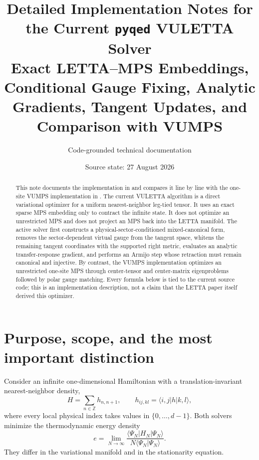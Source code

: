\documentclass[11pt]{article}
\title{Detailed Implementation Notes for the Current \texttt{pyqed} VULETTA Solver\\
\large Exact LETTA--MPS Embeddings, Conditional Gauge Fixing, Analytic Gradients,
Tangent Updates, and Comparison with VUMPS}
\author{Code-grounded technical documentation}
\date{Source state: 27 August 2026}
\begin{document}
\maketitle

\begin{abstract}
This note documents the implementation in  and compares it
line by line with the one-site VUMPS implementation in .
The current VULETTA algorithm is a direct variational optimizer for a uniform
nearest-neighbor leg-tied tensor.  It uses an exact sparse MPS embedding only
to contract the infinite state.  It does not optimize an unrestricted MPS and
does not project an MPS back into the LETTA manifold.  The active solver first
constructs a physical-sector-conditioned mixed-canonical form, removes the
sector-dependent virtual gauge from the tangent space, whitens the remaining
tangent coordinates with the supported right metric, evaluates an analytic
transfer-response gradient, and performs an Armijo step whose retraction must
remain canonical and injective.  By contrast, the VUMPS implementation
optimizes an unrestricted one-site MPS through center-tensor and center-matrix
eigenproblems followed by polar gauge matching.  Every formula below is tied
to the current source code; this is an implementation description, not a
claim that the LETTA paper itself derived this optimizer.
\end{abstract}

\tableofcontents
\clearpage

\section{Purpose, scope, and the most important distinction}

Consider an infinite one-dimensional Hamiltonian with a translation-invariant
nearest-neighbor density,
\begin{equation}
  H=\sum_{n\in\mathbb{Z}} h_{n,n+1},
  \qquad
  h_{ij,kl}=\langle i,j|h|k,l\rangle,
  \label{eq:hamiltonian}
\end{equation}
where every local physical index takes values in
$\{0,\ldots,d-1\}$.  Both solvers minimize the thermodynamic energy density
\begin{equation}
  e=\lim_{N\rightarrow\infty}
  \frac{\langle\Psi_N|H_N|\Psi_N\rangle}
       {N\langle\Psi_N|\Psi_N\rangle}.
  \label{eq:energy-density-definition}
\end{equation}
They differ in the variational manifold and in the stationarity equation.
\end{document}
